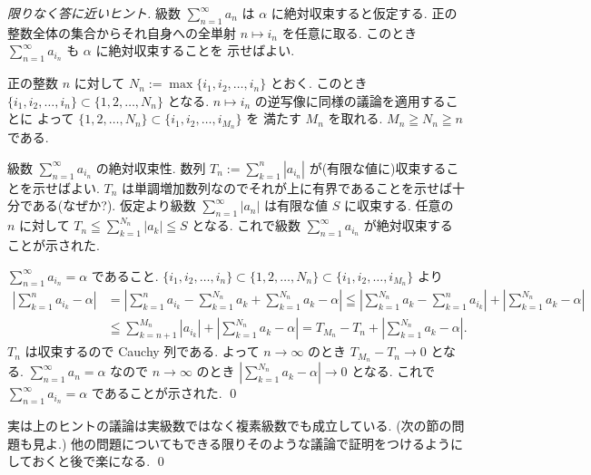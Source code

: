 \documentclass[12pt,twoside]{jarticle}
\begin{document}
\begin{proof}[限りなく答に近いヒント]
 級数 $\sum_{n=1}^\infty a_n$ は $\alpha$ に絶対収束すると仮定する.
 正の整数全体の集合からそれ自身への全単射 $n\mapsto i_n$ を任意に取る.
 このとき $\sum_{n=1}^\infty a_{i_n}$ も $\alpha$ に絶対収束することを
 示せばよい.

 正の整数 $n$ に対して $N_n:=\max\{i_1,i_2,\ldots,i_n\}$ とおく.
 このとき $\{i_1,i_2,\ldots,i_n\}\subset\{1,2,\ldots,N_n\}$ となる.
 $n\mapsto i_n$ の逆写像に同様の議論を適用することに
 よって $\{1,2,\ldots,N_n\}\subset\{i_1,i_2,\ldots,i_{M_n}\}$ を
 満たす $M_n$ を取れる. $M_n\geqq N_n\geqq n$ である.

 級数 $\sum_{n=1}^\infty a_{i_n}$ の絶対収束性.
 数列 $T_n:=\sum_{k=1}^n|a_{i_n}|$ が(有限な値に)収束することを示せばよい.
 $T_n$ は単調増加数列なのでそれが上に有界であることを示せば十分である(なぜか?).
 仮定より級数 $\sum_{n=1}^\infty|a_n|$ は有限な値 $S$ に収束する.
 任意の $n$ に対して $T_n\leqq\sum_{k=1}^{N_n}|a_k|\leqq S$ となる.
 これで級数 $\sum_{n=1}^\infty a_{i_n}$ が絶対収束することが示された.
 
 $\sum_{n=1}^\infty a_{i_n}=\alpha$ であること.
 $\{i_1,i_2,\ldots,i_n\}\subset\{1,2,\ldots,N_n\}
 \subset\{i_1,i_2,\ldots,i_{M_n}\}$ より
 \begin{align*}
  \left|\sum_{k=1}^n a_{i_k}-\alpha\right|
  & =
  \left|\sum_{k=1}^n a_{i_k}-\sum_{k=1}^{N_n}a_k
       +\sum_{k=1}^{N_n}a_k-\alpha\right|
  \leqq
  \left|\sum_{k=1}^{N_n}a_k - \sum_{k=1}^n a_{i_k}\right|
  + \left|\sum_{k=1}^{N_n}a_k-\alpha\right|
  \\ &
  \leqq
  \sum_{k=n+1}^{M_n} |a_{i_k}|
  + \left|\sum_{k=1}^{N_n}a_k-\alpha\right|
  =
  T_{M_n} - T_n
  + \left|\sum_{k=1}^{N_n} a_k-\alpha\right|.
 \end{align*}
 $T_n$ は収束するので Cauchy 列である.
 よって $n\to\infty$ のとき $T_{M_n}-T_n\to 0$ となる. 
 $\sum_{n=1}^\infty a_n=\alpha$ なので $n\to\infty$ 
 のとき $\left|\sum_{k=1}^{N_n}a_k-\alpha\right|\to 0$ となる.
 これで $\sum_{n=1}^\infty a_{i_n}=\alpha$ であることが示された.
 \qed
\end{proof}

\begin{rem}
 実は上のヒントの議論は実級数ではなく複素級数でも成立している.
 (次の節の問題も見よ.)
 他の問題についてもできる限りそのような議論で証明をつけるように
 しておくと後で楽になる.
 \qed
\end{rem}
\end{document}
